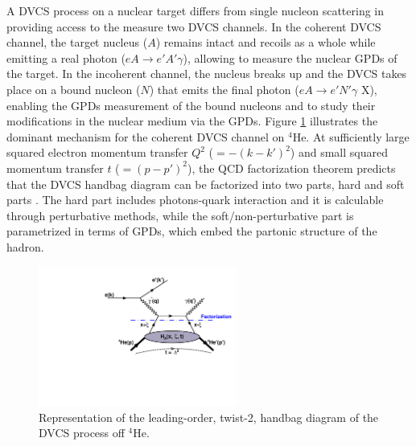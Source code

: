 \documentclass[nofootinbib,twocolumn,showpacs,prl,superscriptaddress,secnumarabic,amssymb,nobibnotes,aps,floatfix]{revtex4}
\begin{document}
A DVCS process on a nuclear target differs from single nucleon scattering in 
providing access to the measure two DVCS channels. In the coherent DVCS 
channel, the target nucleus ($A$) remains intact and recoils as a whole while 
emitting a real photon ($eA \rightarrow e' A' \gamma$), allowing to measure the 
nuclear GPDs of the target. In the incoherent channel, the nucleus breaks up 
and the DVCS takes place on a bound nucleon ($N$) that emits the final photon 
($eA \rightarrow e' N' \gamma$ X), enabling the GPDs measurement of the bound 
nucleons and to study their modifications in the nuclear medium via the GPDs.  
Figure \ref{fig:diags} illustrates the dominant mechanism for the coherent DVCS 
channel on $^4$He. At sufficiently large squared electron momentum transfer 
$Q^2$ ($= -(k-k')^{2}$) and small squared momentum transfer $t$ ($= 
(p-p')^{2}$), the QCD factorization theorem predicts that the DVCS handbag 
diagram can be factorized into two parts, hard and soft parts 
\cite{Freund_Collins,Ji_Osborne}. The hard part includes photons-quark 
interaction and it is calculable through perturbative methods, while the 
soft/non-perturbative part is parametrized in terms of GPDs, which embed the 
partonic structure of the hadron.  \begin{figure}[tb]
\includegraphics[width=6.5cm]{figs/DVCS_diagram.pdf}
\caption{Representation of the leading-order, twist-2, handbag diagram of the 
DVCS process off $^4$He.}
\label{fig:diags}
\end{figure}
\end{document}
